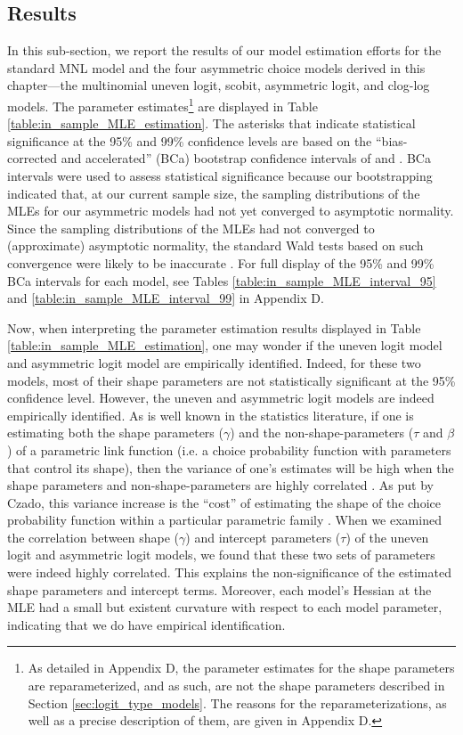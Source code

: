 \subsection{Results}
\label{sec:application_results}
In this sub-section, we report the results of our model estimation efforts for the standard MNL model and the four asymmetric choice models derived in this chapter---the multinomial uneven logit, scobit, asymmetric logit, and clog-log models. The parameter estimates\footnote{As detailed in Appendix D, the parameter estimates for the shape parameters are reparameterized, and as such, are not the shape parameters described in Section \ref{sec:logit_type_models}. The reasons for the reparameterizations, as well as a precise description of them, are given in Appendix D.} are displayed in Table \ref{table:in_sample_MLE_estimation}. The asterisks that indicate statistical significance at the 95\% and 99\% confidence levels are based on the ``bias-corrected and accelerated'' (BCa) bootstrap confidence intervals of \citet{efron_introduction_1993} and \citet{diciccio_bootstrap_1996}. BCa intervals were used to assess statistical significance because our bootstrapping indicated that, at our current sample size, the sampling distributions of the MLEs for our asymmetric models had not yet converged to asymptotic normality. Since the sampling distributions of the MLEs had not converged to (approximate) asymptotic normality, the standard Wald tests based on such convergence were likely to be inaccurate \citep{jennings_judging_1986, pawitan_2000_reminder}. For full display of the 95\% and 99\% BCa intervals for each model, see Tables \ref{table:in_sample_MLE_interval_95} and \ref{table:in_sample_MLE_interval_99} in Appendix D.

Now, when interpreting the parameter estimation results displayed in Table \ref{table:in_sample_MLE_estimation}, one may wonder if the uneven logit model and asymmetric logit model are empirically identified. Indeed, for these two models, most of their shape parameters are not statistically significant at the 95\% confidence level. However, the uneven and asymmetric logit models are indeed empirically identified. As is well known in the statistics literature, if one is estimating both the shape parameters ($\gamma$) and the non-shape-parameters ($\tau$ and $\beta$) of a parametric link function (i.e. a choice probability function with parameters that control its shape), then the variance of one's estimates will be high when the shape parameters and non-shape-parameters are highly correlated \citep{stukel_generalized_1988, taylor_cost_1988, czado_orthogonalizing_1992}. As put by Czado, this variance increase is the ``cost'' of estimating the shape of the choice probability function within a particular parametric family \citep{czado_orthogonalizing_1992}. When we examined the correlation between shape ($\gamma$) and intercept parameters ($\tau$) of the uneven logit and asymmetric logit models, we found that these two sets of parameters were indeed highly correlated. This explains the non-significance of the estimated shape parameters and intercept terms. Moreover, each model's Hessian at the MLE had a small but existent curvature with respect to each model parameter, indicating that we do have empirical identification.

